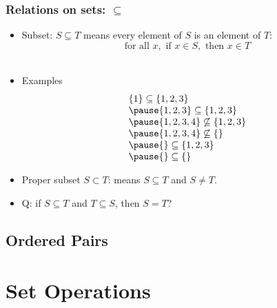 \documentclass{beamer}
\newtheorem{remark}{}
\begin{document}
\frame
{
    \frametitle{Relations on sets: $\subseteq$}

\begin{itemize}    
\item Subset: $S \subseteq T$ means  every element of $S$ is an element of $T$: 
\[
\mbox{for all } x, \mbox{ if } x \in S, \mbox{ then } x \in T
\]
\pause
\\
\item Examples
\[ 
\begin{array}{lcl}
\{1\} \subseteq \{1,2,3\}
\\
\pause
\{1,2,3\} \subseteq \{1,2,3\}
\\
\pause
\{1,2,3,4\} \not\subseteq \{1,2,3\}
\\
\pause
\{1,2,3,4\} \not\subseteq \{\}
\\
\pause
\{\} \subseteq \{1,2,3\}
\\
\pause
\{\} \subseteq \{\}
\end{array}
\]
\pause
\item Proper subset  $S \subset T$: means  $S \subseteq T$ and $S \not= T$.

\pause

\item Q: if $S \subseteq T$ and $T \subseteq S$, then $S = T$?

\end{itemize}

}

\subsection{Ordered Pairs}

\section{Set Operations}
\end{document}
